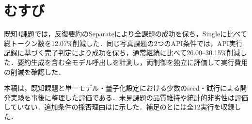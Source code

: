 \documentclass[letter]{ieicej}
\begin{document}
\newpage
\section{むすび}

既知4課題では，反復要約のSeparateにより全課題の成功を保ち，Singleに比べて総トークン数を12.07\%削減した．同じ写真課題の2つのAPI条件では，API実行記録に基づく完了判定により成功を保ち，通常継続に比べて26.00--30.15\%削減した．要約生成を含む全モデル呼出しを計測し，両制御を独立に評価して実行費用の削減を確認した．

本稿は，既知課題と単一モデル・量子化設定における少数のseed・試行による開発実験を事後に整理した評価である．未見課題の品質維持や統計的非劣性は評価していない．追加条件の採否理由はに示した．補足のとには\mbox{全12実行を収録した．}


\end{document}
